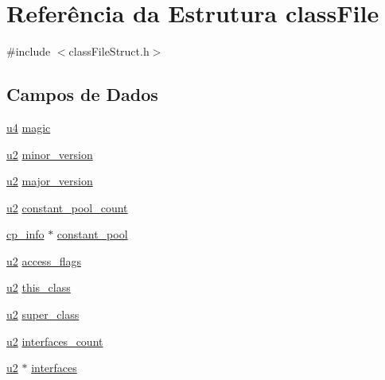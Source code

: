 \hypertarget{structclassFile}{}\section{Referência da Estrutura class\+File}
\label{structclassFile}


{\ttfamily \#include $<$class\+File\+Struct.\+h$>$}

\subsection*{Campos de Dados}
\begin{DoxyCompactItemize}
\item 
\hyperlink{lista__operandos_8h_ae5be1f726785414dd1b77d60df074c9d}{u4} \hyperlink{structclassFile_a3fec808625410854af3cb80b7faeca10}{magic}
\item 
\hyperlink{lista__operandos_8h_a732cde1300aafb73b0ea6c2558a7a54f}{u2} \hyperlink{structclassFile_aa7b4e7ee91468a9a2989dd9ec93c3ea0}{minor\+\_\+version}
\item 
\hyperlink{lista__operandos_8h_a732cde1300aafb73b0ea6c2558a7a54f}{u2} \hyperlink{structclassFile_a3765d2f6ef5f54e8e2c554afadb795f6}{major\+\_\+version}
\item 
\hyperlink{lista__operandos_8h_a732cde1300aafb73b0ea6c2558a7a54f}{u2} \hyperlink{structclassFile_ac8f5b297483f2b3e9f02ff133f248b40}{constant\+\_\+pool\+\_\+count}
\item 
\hyperlink{structcp__info}{cp\+\_\+info} $\ast$ \hyperlink{structclassFile_adb70ba83c3ffbcc26bffaff8185be813}{constant\+\_\+pool}
\item 
\hyperlink{lista__operandos_8h_a732cde1300aafb73b0ea6c2558a7a54f}{u2} \hyperlink{structclassFile_a78e101546396d4b3d24d89b084b4eadf}{access\+\_\+flags}
\item 
\hyperlink{lista__operandos_8h_a732cde1300aafb73b0ea6c2558a7a54f}{u2} \hyperlink{structclassFile_a152ce2f57b3fa175b95069452f9fa063}{this\+\_\+class}
\item 
\hyperlink{lista__operandos_8h_a732cde1300aafb73b0ea6c2558a7a54f}{u2} \hyperlink{structclassFile_a7d16e11061e4520ac93df39a5a65a215}{super\+\_\+class}
\item 
\hyperlink{lista__operandos_8h_a732cde1300aafb73b0ea6c2558a7a54f}{u2} \hyperlink{structclassFile_ab1ef5a76288d97e248fd48a46e93a185}{interfaces\+\_\+count}
\item 
\hyperlink{lista__operandos_8h_a732cde1300aafb73b0ea6c2558a7a54f}{u2} $\ast$ \hyperlink{structclassFile_a4b17bc5bb5475d1f7db40302ba9e1df1}{interfaces}

\end{DoxyCompactItemize}
